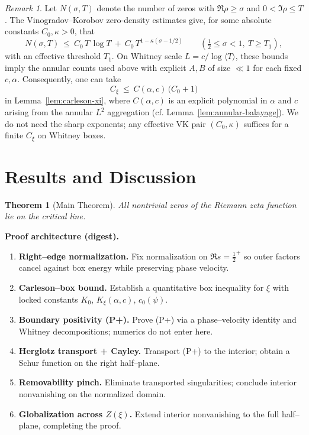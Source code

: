 \documentclass[11pt]{article}
\newtheorem{theorem}{Theorem}[section]
\theoremstyle{definition}
\theoremstyle{remark}
\newtheorem{remark}{Remark}[section]
\begin{document}
\begin{remark}
Let $N(\sigma,T)$ denote the number of zeros with $\Re\rho\ge \sigma$ and $0<\Im\rho\le T$. The Vinogradov–Korobov zero-density estimates give, for some absolute constants $C_0,\kappa>0$, that
\[
  N(\sigma,T)\ \le\ C_0\,T\,\log T\ +\ C_0\,T^{1-\kappa(\sigma-1/2)}\qquad (\tfrac12\le \sigma<1,\ T\ge T_1),
\]
with an effective threshold $T_1$. On Whitney scale $L=c/\log\langle T\rangle$, these bounds imply the annular counts used above with explicit $A,B$ of size $\ll 1$ for each fixed $c,\alpha$. Consequently, one can take
\[
  C_\xi\ \le\ C(\alpha,c)\,\big(C_0+1\big)
\]
in Lemma~\ref{lem:carleson-xi}, where $C(\alpha,c)$ is an explicit polynomial in $\alpha$ and $c$ arising from the annular $L^2$ aggregation (cf. Lemma~\ref{lem:annular-balayage}). We do not need the sharp exponents; any effective VK pair $(C_0,\kappa)$ suffices for a finite $C_\xi$ on Whitney boxes.
\end{remark}




\vspace{1.0cm}
\section{Results and Discussion}\label{sec:results}  %
\begin{theorem}[Main Theorem]
All nontrivial zeros of the Riemann zeta function lie on the critical line.
\end{theorem}

\noindent\textbf{Proof architecture (digest).}
\begin{enumerate}
  \item \textbf{Right–edge normalization.} Fix normalization on $\Re s=\tfrac12^+$ so outer factors cancel against box energy while preserving phase velocity.
  \item \textbf{Carleson–box bound.} Establish a quantitative box inequality for $\xi$ with locked constants $K_0$, $K_\xi(\alpha,c)$, $c_0(\psi)$.
  \item \textbf{Boundary positivity (P+).} Prove (P+) via a phase–velocity identity and Whitney decompositions; numerics do not enter here.
  \item \textbf{Herglotz transport + Cayley.} Transport (P+) to the interior; obtain a Schur function on the right half–plane.
  \item \textbf{Removability pinch.} Eliminate transported singularities; conclude interior nonvanishing on the normalized domain.
  \item \textbf{Globalization across $Z(\xi)$.} Extend interior nonvanishing to the full half–plane, completing the proof.
\end{enumerate}
\end{document}
